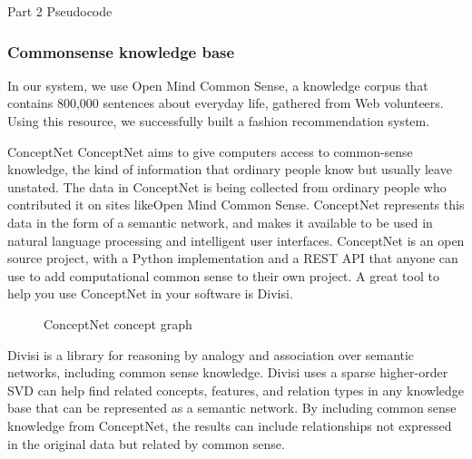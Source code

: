 \documentclass[11pt,twocolumn]{article}
\begin{document}
Part 2
Pseudocode


\subsubsection{Commonsense knowledge base}
In our system, we use Open Mind Common Sense, a knowledge corpus that contains 800,000 sentences about everyday life, gathered from Web volunteers. Using this resource, we successfully built a fashion recommendation system.

{\large ConceptNet}
ConceptNet aims to give computers access to common-sense knowledge, the kind of information that ordinary people know but usually leave unstated.
The data in ConceptNet is being collected from ordinary people who contributed it on sites likeOpen Mind Common Sense. ConceptNet represents this data in the form of a semantic network, and makes it available to be used in natural language processing and intelligent user interfaces.
ConceptNet is an open source project, with a Python implementation and a REST API that anyone can use to add computational common sense to their own project. A great tool to help you use ConceptNet in your software is Divisi.

\begin{figure}[h!t]
\caption{ConceptNet concept graph}
\label{graph}
\end{figure}


{\large Divisi}
is a library for reasoning by analogy and association over semantic networks, including common sense knowledge.
Divisi uses a sparse higher-order SVD can help find related concepts, features, and relation types in any knowledge base that can be represented as a semantic network. By including common sense knowledge from ConceptNet, the results can include relationships not expressed in the original data but related by common sense.
\end{document}
